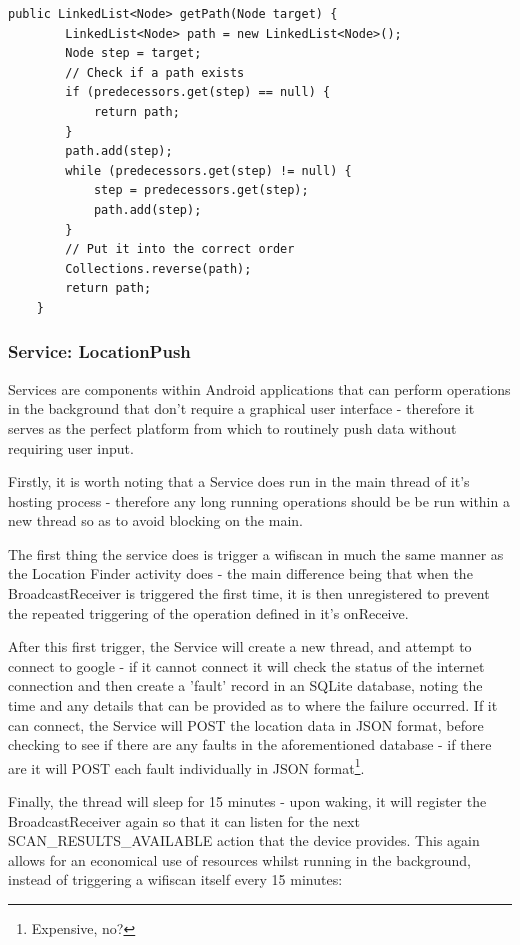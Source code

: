 \documentclass[11pt]{informatics-report}
\begin{document}
\begin{verbatim}
public LinkedList<Node> getPath(Node target) {
        LinkedList<Node> path = new LinkedList<Node>();
        Node step = target;
        // Check if a path exists
        if (predecessors.get(step) == null) {
            return path;
        }
        path.add(step);
        while (predecessors.get(step) != null) {
            step = predecessors.get(step);
            path.add(step);
        }
        // Put it into the correct order
        Collections.reverse(path);
        return path;
    }
\end{verbatim}

\subsubsection{Service: LocationPush}

Services are components within Android applications that can perform operations in the background that don't require a graphical user interface\cite{androidservices} - therefore it serves as the perfect platform from which to routinely push data without requiring user input.

Firstly, it is worth noting that a Service does run in the main thread of it's hosting process - therefore any long running operations should be be run within a new thread so as to avoid blocking on the main.

The first thing the service does is trigger a wifiscan in much the same manner as the Location Finder activity does - the main difference being that when the BroadcastReceiver is triggered the first time, it is then unregistered to prevent the repeated triggering of the operation defined in it's onReceive.

After this first trigger, the Service will create a new thread, and attempt to connect to google - if it cannot connect it will check the status of the internet connection and then create a 'fault' record in an SQLite database, noting the time and any details that can be provided as to where the failure occurred. If it can connect, the Service will POST the location data in JSON format, before checking to see if there are any faults in the aforementioned database - if there are it will POST each fault individually in JSON format\footnote{Expensive, no?}.

Finally, the thread will sleep for 15 minutes - upon waking, it will register the BroadcastReceiver again so that it can listen for the next SCAN\_RESULTS\_AVAILABLE action that the device provides. This again allows for an economical use of resources whilst running in the background, instead of triggering a wifiscan itself every 15 minutes:
\end{document}
